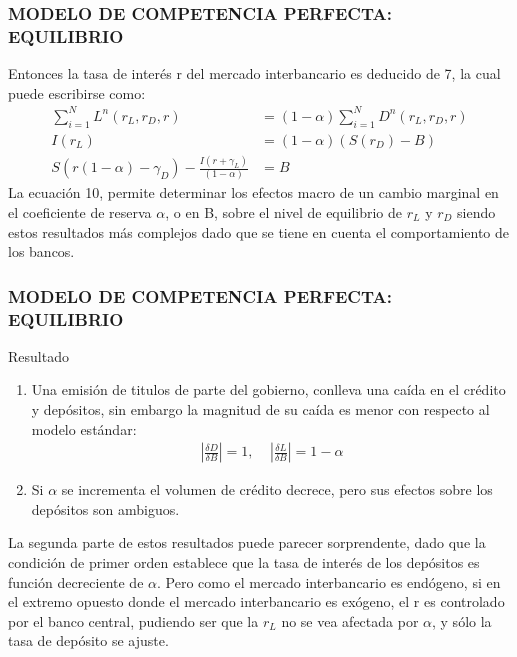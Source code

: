 \begin{frame}
    \frametitle{{\normalsize MODELO DE COMPETENCIA PERFECTA: EQUILIBRIO} {}}
    Entonces la tasa de interés r del mercado interbancario es deducido de 7, la cual puede escribirse como:
    \begin{align}
    \sum_{i=1}^{N}L^{n}(r_{L}, r_{D}, r)&=(1-\alpha)\sum_{i=1}^{N}D^{n}(r_{L}, r_{D}, r)  \nonumber \\
    I(r_{L})&=(1-\alpha)(S(r_{D})-B) \nonumber \\
    S(r(1-\alpha)-\gamma_{D})-\frac{I(r+\gamma_{L})}{(1-\alpha)} &=B
    \end{align} 
    La ecuación 10, permite determinar los efectos macro de un cambio marginal en el coeficiente de reserva $\alpha$, o en B, sobre el nivel de equilibrio de $r_{L}$ y $r_{D}$ siendo estos resultados más complejos dado que se tiene en cuenta el comportamiento de los bancos.
\end{frame}

\begin{frame}\frametitle{{\normalsize MODELO DE COMPETENCIA PERFECTA: EQUILIBRIO} {}}
    
    \begin{block} {Resultado}
        \begin{enumerate}
            \item Una emisión de titulos de parte del gobierno, conlleva una caída en el crédito y depósitos, sin embargo la magnitud de su caída es menor con respecto al modelo estándar:
            \begin{align}
            |\frac{\delta D}{\delta B}| =1,\;\;\;\; |\frac{\delta L}{\delta B}|=1-\alpha \nonumber 
            \end{align} 
            \item Si $\alpha$ se incrementa el volumen de crédito decrece, pero sus efectos sobre los depósitos son ambiguos.
        \end{enumerate}    
   
    \end{block}	 
    
     La segunda parte de estos resultados puede parecer sorprendente, dado que la condición de primer orden establece que la tasa de interés de los depósitos es función decreciente de  $\alpha$. Pero como el mercado interbancario es endógeno, si en el extremo opuesto donde el mercado interbancario es exógeno, el r es controlado por el banco central, pudiendo ser que la $r_{L}$ no se vea afectada por $\alpha$, y sólo la tasa de depósito se ajuste.  
    
\end{frame}

